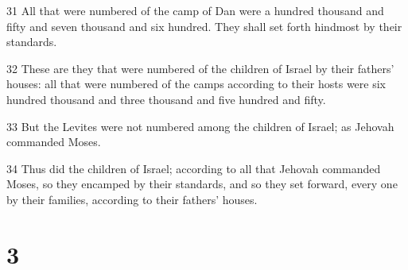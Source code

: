 \par 31 All that were numbered of the camp of Dan were a hundred thousand and fifty and seven thousand and six hundred. They shall set forth hindmost by their standards.
\par 32 These are they that were numbered of the children of Israel by their fathers' houses: all that were numbered of the camps according to their hosts were six hundred thousand and three thousand and five hundred and fifty.
\par 33 But the Levites were not numbered among the children of Israel; as Jehovah commanded Moses.
\par 34 Thus did the children of Israel; according to all that Jehovah commanded Moses, so they encamped by their standards, and so they set forward, every one by their families, according to their fathers' houses.

\chapter{3}


